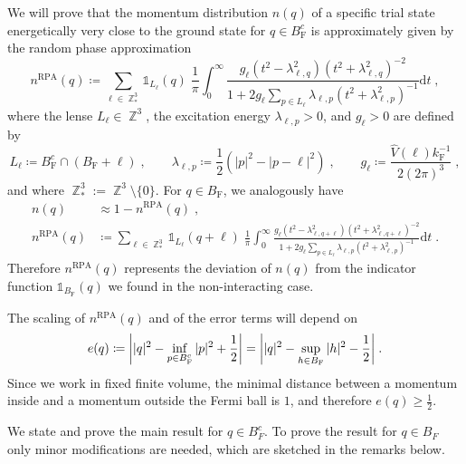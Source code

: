 \documentclass[12pt,a4paper]{article}
\numberwithin{equation}{section}
\newcommand{\1}{\mathbb{I}}
\newcommand{\F}{\mathrm{F}}
\newcommand{\RPA}{\mathrm{RPA}}
\DeclareMathOperator{\Z}{\mathbb{Z}}
\newcommand{\half}{\frac{1}{2}}
\theoremstyle{plain}
\theoremstyle{definition}
\theoremstyle{remark}
\theoremstyle{plain}
\theoremstyle{definition}
\theoremstyle{remark}
\begin{document}
We will prove that the momentum distribution $ n(q) $ of a specific trial state energetically very close to the ground state for $ q \in B_{\F}^c $ is approximately given by the random phase approximation
\begin{equation} \label{eq:nqb}
	n^{\RPA}(q)
	\coloneq \sum_{\ell \in \Z^3_*}\mathds{1}_{L_{\ell}}(q) \; \frac{1}{\pi}\int_0^\infty \frac{g_\ell (t^2-\lambda^2_{\ell,q}) (t^2 + \lambda^2_{\ell,q})^{-2}}{1 + 2g_\ell \sum_{p \in L_{\ell}}\lambda_{\ell,p} (t^2+\lambda^2_{\ell,p})^{-1}} \mathrm{d}t \;,
\end{equation}
where the lense $ L_\ell \in \Z^3 $, the excitation energy $ \lambda_{\ell,p} > 0 $, and $ g_\ell > 0 $ are defined by
\begin{equation} \label{eq:Lell}
	L_\ell \coloneq B_{\F}^c \cap (B_{\F} + \ell) \;, \qquad
	\lambda_{\ell,p} \coloneq \half (|p|^2 - |p-\ell|^2) \;, \qquad
	g_\ell \coloneq \frac{\hat{V}(\ell) k_{\F}^{-1}}{2 (2 \pi)^3} \;,
\end{equation}
and where $ \Z^3_* := \Z^3 \setminus \{0\} $. For $ q \in B_{\F} $, we analogously have
\begin{equation}
\begin{split}
	n(q) & \approx 1 - n^{\RPA}(q) \;, \\
	n^{\RPA}(q) & 	\coloneq \sum_{\ell \in \Z^3_*}\mathds{1}_{L_{\ell}}(q+\ell) \; \frac{1}{\pi}\int_0^\infty \frac{g_\ell (t^2-\lambda^2_{\ell,q+\ell}) (t^2 + \lambda^2_{\ell,q+\ell})^{-2}}{1 + 2g_\ell \sum_{p \in L_{\ell}}\lambda_{\ell,p} (t^2+\lambda^2_{\ell,p})^{-1}} \mathrm{d}t \;.
\end{split}
\end{equation}
Therefore $ n^{\RPA}(q) $ represents the deviation of $ n(q) $ from the indicator function $ \mathds{1}_{B_{\F}}(q) $ we found in the non-interacting case.

The scaling of $ n^{\RPA}(q) $ and of the error terms will depend on
\begin{equation} \label{eq:eq}
	e(q)
	\coloneq \abs{|q|^2 - \inf_{p \in B_{\F}^c} |p|^2 + \half}
	= \abs{|q|^2 - \sup_{h \in B_{\F}} |h|^2 - \half} \;.
\end{equation}
Since we work in fixed finite volume, the minimal distance between a momentum inside and a momentum outside the Fermi ball is $1$, and therefore $ e(q) \ge \half $.

We state and prove the main result for $q \in B_F^c$. To prove the result for $q \in B_F$ only minor modifications are needed, which are sketched in the remarks below.
\end{document}
